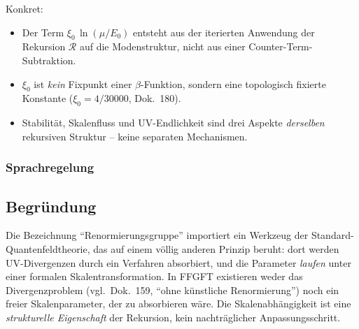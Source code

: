 Konkret:
\begin{itemize}
  \item Der Term $\xi_0\,\ln(\mu/E_0)$ entsteht aus der iterierten
        Anwendung der Rekursion $\mathcal{R}$ auf die Modenstruktur,
        nicht aus einer Counter-Term-Subtraktion.
  \item $\xi_0$ ist \emph{kein} Fixpunkt einer $\beta$-Funktion,
        sondern eine topologisch fixierte Konstante
        ($\xi_0 = 4/30000$, Dok.~180).
  \item Stabilität, Skalenfluss und UV-Endlichkeit sind drei Aspekte
        \emph{derselben} rekursiven Struktur -- keine separaten
        Mechanismen.
\end{itemize}

\subsubsection*{Sprachregelung}

\begin{center}
{\footnotesize
{}
}
\end{center}

\subsection*{Begründung}

Die Bezeichnung \enquote{Renormierungsgruppe} importiert ein Werkzeug
der Standard-Quantenfeldtheorie, das auf einem völlig anderen Prinzip
beruht: dort werden UV-Divergenzen durch ein Verfahren absorbiert, und
die Parameter \emph{laufen} unter einer formalen Skalentransformation.
In FFGFT existieren weder das Divergenzproblem (vgl.\ Dok.~159,
\enquote{ohne künstliche Renormierung}) noch ein freier Skalenparameter, der
zu absorbieren wäre. Die Skalenabhängigkeit ist eine \emph{strukturelle
Eigenschaft} der Rekursion, kein nachträglicher Anpassungsschritt.

